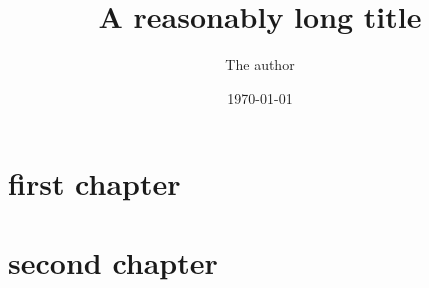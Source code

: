 \documentclass[twoside]{report}
\title{A reasonably long title}
\date{\today}
\author{The author}
\begin{document}
\maketitle
\chapter{first chapter}
\lipsum[1-9]

\chapter{second chapter}
\lipsum[10-19]
\end{document}
